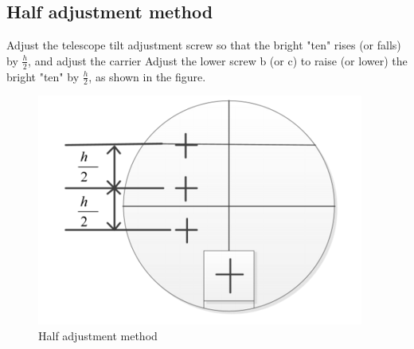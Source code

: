 \documentclass[UTF8]{article}
\begin{document}
     \subsection{Half adjustment method}
     Adjust the telescope tilt adjustment screw so that the bright "ten" rises (or falls) by $\frac{h}{2}$, and adjust the carrier Adjust the lower screw b (or c) to raise (or lower) the bright "ten" by $\frac{h}{2}$, as shown in the figure.
     \begin{figure}[H]
         	\centering
         	\includegraphics[clip,scale=1,trim={0 0 0 0}]{fig/fig11.png}
         	\caption{Half adjustment method}
         	\label{figure.11}
         	\end{figure} 
     
     
\end{document}
